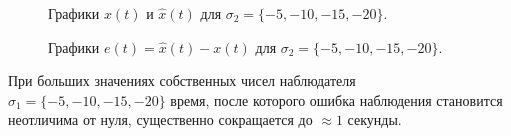 \begin{figure}[!h]
\caption{Графики $x(t)$ и $\hat{x}(t)$ для $ \sigma_2 = \{ -5, -10, -15, -20 \}$.}
\label{3_xx_nlin_02_L3}
\end{figure}


\begin{figure}[!h]
\caption{Графики $e (t) =\hat{x}(t) - x(t)$ для $ \sigma_2 = \{ -5, -10, -15, -20 \}$.}
\label{3_e_nlin_02_L3}
\end{figure}

При больших значениях собственных чисел наблюдателя $ \sigma_1 = \{ -5, -10, -15, -20 \}$ время, после которого ошибка наблюдения становится неотличима от нуля, существенно сокращается до $\approx 1$ секунды. 


